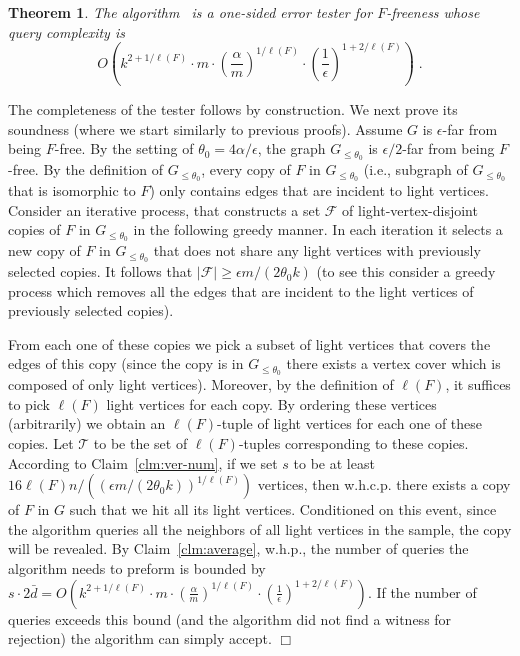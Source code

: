 \documentclass{article}
\newcommand{\eps}{\epsilon}
\newcommand{\calT}{{\mathcal{T}}}
\newenvironment{proof}{\smallskip\noindent{\bf Proof:}}%
        {\hspace*{\fill}$\Box$\par}
\newtheorem{theorem}{Theorem}
\newcommand{\commentt}[1]{ {}}
\newcommand{\TestFfree}{\hyperref[alg:Ffree]{\color{black}{\textsf{Test-subgraph-freeness}}}}
\begin{document}
\begin{theorem}\label{thm:Gen-F-ub}
The algorithm \TestFfree\ is a one-sided error tester for $F$-freeness whose query complexity is $$O\left(k^{2+1/\ell(F)} \cdot m \cdot \left(\frac{\alpha}{m }\right)^{1/\ell(F)} \cdot \left(\frac{1}{\epsilon}\right)^{1+2/\ell(F)}\right)\;.$$
\end{theorem}

\begin{proof}
The completeness of the tester follows by construction.
We next prove its soundness (where we start similarly to previous proofs). Assume $G$ is $\epsilon$-far from being $F$-free.
By the setting of $\theta_0 = 4\alpha/\eps$, the graph $G_{\leq \theta_0}$ is $\eps/2$-far from being $F$-free. By the definition of $G_{\leq \theta_0}$, every copy of $F$ in $G_{\leq \theta_0}$ (i.e.,  subgraph of $G_{\leq \theta_0}$ that is isomorphic to $F$) only contains edges that are incident to light vertices.
Consider an iterative process, that constructs a set $\mathcal{F}$ of light-vertex-disjoint copies of $F$ in $G_{\leq \theta_0}$ in the following greedy manner. In each iteration it selects a new copy of $F$ in $G_{\leq \theta_0}$ that does not share any light vertices with previously selected copies. 
It follows that $|\mathcal{F}| \geq \eps m/ (2\theta_0 k)$ (to see this consider a greedy process which removes all the edges that are incident to the light vertices of previously selected copies). %

From each one of these copies we pick a subset of light vertices that covers the edges of this copy (since the copy is in $G_{\leq \theta_0}$ there exists a vertex cover which is composed of only light vertices).
Moreover, by the definition of $\ell(F)$, it suffices to pick $\ell(F)$ light vertices for each copy.
By ordering these vertices (arbitrarily) we obtain an $\ell(F)$-tuple of light vertices for each one of these copies.
Let $\calT$ to be the set of $\ell(F)$-tuples corresponding to these copies. According to Claim~\ref{clm:ver-num}, if we set $s$ to be at least $16 \ell(F) n / ((\epsilon m/ (2\theta_0 k))^{1/\ell(F)})$ vertices, then w.h.c.p. there exists a copy of $F$ in $G$ such that we hit all its light vertices. Conditioned on this event, since the algorithm queries all the neighbors of all light vertices in the sample, the copy will be revealed.
By Claim~\ref{clm:average}, w.h.p., the number of queries the algorithm needs to preform is bounded by $s \cdot 2\bar{d} = O\left(k^{2+1/\ell(F)} \cdot m \cdot \left(\frac{\alpha}{m }\right)^{1/\ell(F)} \cdot \left(\frac{1}{\epsilon}\right)^{1+2/\ell(F)}\right)$. If the number of queries exceeds this bound (and the algorithm did not find a witness for rejection) the algorithm can simply accept. 
\end{proof}
\end{document}
